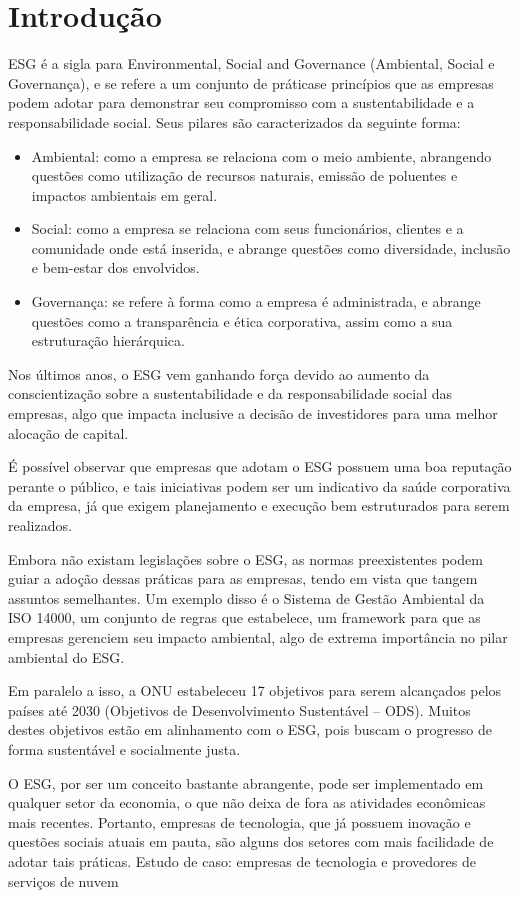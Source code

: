 \documentclass[12pt]{article}
\begin{document}
	\section*{Introdução}
	ESG é a sigla para Environmental, Social and Governance (Ambiental, Social e Governança), e se refere a um conjunto de práticase princípios que as empresas podem adotar para demonstrar seu compromisso com a sustentabilidade e a responsabilidade social. Seus pilares são caracterizados da seguinte forma:
	\begin{itemize}
		\item Ambiental: como a empresa se relaciona com o meio ambiente, abrangendo questões como utilização de recursos naturais, emissão de poluentes e impactos ambientais em geral.
		\item Social: como a empresa se relaciona com seus funcionários, clientes e a comunidade onde está inserida, e abrange questões como diversidade, inclusão e bem-estar dos envolvidos.
		\item Governança: se refere à forma como a empresa é administrada, e abrange questões como a transparência e ética corporativa, assim como a sua estruturação hierárquica.
	\end{itemize}
	Nos últimos anos, o ESG vem ganhando força devido ao aumento da conscientização sobre a sustentabilidade e da responsabilidade social das empresas, algo que impacta inclusive a decisão de investidores para uma melhor alocação de capital.
	
	É possível observar que empresas que adotam o ESG possuem uma boa reputação perante o público, e tais iniciativas podem ser um indicativo da saúde corporativa da empresa, já que exigem planejamento e execução bem estruturados para serem realizados.
	
	Embora não existam legislações sobre o ESG, as normas preexistentes podem guiar a adoção dessas práticas para as empresas, tendo em vista que tangem assuntos semelhantes. Um exemplo disso é o Sistema de Gestão Ambiental da ISO 14000, um conjunto de regras que estabelece, um framework para que as empresas gerenciem seu impacto ambiental, algo de extrema importância no pilar ambiental do ESG.
	
	Em paralelo a isso, a ONU estabeleceu 17 objetivos para serem alcançados pelos países até 2030 (Objetivos de Desenvolvimento Sustentável – ODS). Muitos destes objetivos estão em alinhamento com o ESG, pois buscam o progresso de forma sustentável e socialmente justa.
	
	O ESG, por ser um conceito bastante abrangente, pode ser implementado em qualquer setor da economia, o que não deixa de fora as atividades econômicas mais recentes. Portanto, empresas de tecnologia, que já possuem inovação e questões sociais atuais em pauta, são alguns dos setores com mais facilidade de adotar tais práticas.
	Estudo de caso: empresas de tecnologia e provedores de serviços de nuvem
	
\end{document}
